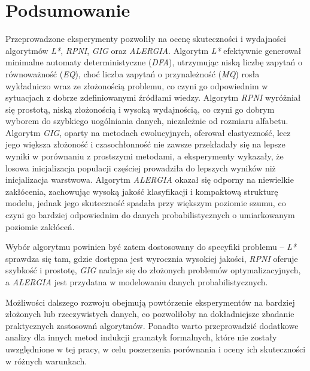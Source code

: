 \section{Podsumowanie}  
Przeprowadzone eksperymenty pozwoliły na ocenę skuteczności i wydajności algorytmów \textit{L*}, \textit{RPNI}, \textit{GIG} oraz \textit{ALERGIA}. Algorytm \textit{L*} efektywnie generował minimalne automaty deterministyczne (\textit{DFA}), utrzymując niską liczbę zapytań o równoważność (\textit{EQ}), choć liczba zapytań o przynależność (\textit{MQ}) rosła wykładniczo wraz ze złożonością problemu, co czyni go odpowiednim w sytuacjach z dobrze zdefiniowanymi źródłami wiedzy. Algorytm \textit{RPNI} wyróżniał się prostotą, niską złożonością i wysoką wydajnością, co czyni go dobrym wyborem do szybkiego uogólniania danych, niezależnie od rozmiaru alfabetu. Algorytm \textit{GIG}, oparty na metodach ewolucyjnych, oferował elastyczność, lecz jego większa złożoność i czasochłonność nie zawsze przekładały się na lepsze wyniki w porównaniu z prostszymi metodami, a eksperymenty wykazały, że losowa inicjalizacja populacji częściej prowadziła do lepszych wyników niż inicjalizacja warstwowa. Algorytm \textit{ALERGIA} okazał się odporny na niewielkie zakłócenia, zachowując wysoką jakość klasyfikacji i kompaktową strukturę modelu, jednak jego skuteczność spadała przy większym poziomie szumu, co czyni go bardziej odpowiednim do danych probabilistycznych o umiarkowanym poziomie zakłóceń.  

Wybór algorytmu powinien być zatem dostosowany do specyfiki problemu -- \textit{L*} sprawdza się tam, gdzie dostępna jest wyrocznia wysokiej jakości, \textit{RPNI} oferuje szybkość i prostotę, \textit{GIG} nadaje się do złożonych problemów optymalizacyjnych, a \textit{ALERGIA} jest przydatna w modelowaniu danych probabilistycznych.  

Możliwości dalszego rozwoju obejmują powtórzenie eksperymentów na bardziej złożonych lub rzeczywistych danych, co pozwoliłoby na dokładniejsze zbadanie praktycznych zastosowań algorytmów. Ponadto warto przeprowadzić dodatkowe analizy dla innych metod indukcji gramatyk formalnych, które nie zostały uwzględnione w tej pracy, w celu poszerzenia porównania i oceny ich skuteczności w różnych warunkach.
